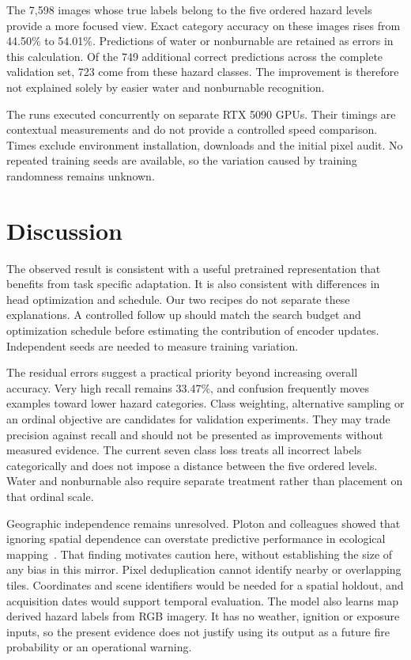 \documentclass[10pt,a4paper]{article}
\begin{document}
The 7,598 images whose true labels belong to the five ordered hazard levels
provide a more focused view. Exact category accuracy on these images rises
from 44.50\% to 54.01\%. Predictions of water or nonburnable are retained as
errors in this calculation. Of the 749 additional correct predictions
across the complete validation set, 723 come from these hazard classes.
The improvement is therefore not explained solely by easier water and
nonburnable recognition.

The runs executed concurrently on separate RTX 5090 GPUs. Their timings are
contextual measurements and do not provide a controlled speed comparison.
Times exclude environment installation, downloads and the initial pixel
audit. No repeated training seeds are available, so the variation caused by
training randomness remains unknown.

\section{Discussion}

The observed result is consistent with a useful pretrained representation
that benefits from task specific adaptation. It is also consistent with
differences in head optimization and schedule. Our two recipes do not
separate these explanations. A controlled follow up should match the search
budget and optimization schedule before estimating the contribution of
encoder updates. Independent seeds are needed to measure training variation.

The residual errors suggest a practical priority beyond increasing overall
accuracy. Very high recall remains 33.47\%, and confusion frequently moves
examples toward lower hazard categories. Class weighting, alternative
sampling or an ordinal objective are candidates for validation experiments.
They may trade precision against recall and should not be presented as
improvements without measured evidence. The current seven class loss treats
all incorrect labels categorically and does not impose a distance between
the five ordered levels. Water and nonburnable also require separate
treatment rather than placement on that ordinal scale.

Geographic independence remains unresolved. Ploton and colleagues showed
that ignoring spatial dependence can overstate predictive performance in
ecological mapping~\citep{ploton2020spatial}. That finding motivates caution
here, without establishing the size of any bias in this mirror. Pixel
deduplication cannot identify nearby or overlapping tiles. Coordinates and
scene identifiers would be needed for a spatial holdout, and acquisition
dates would support temporal evaluation. The model also learns map derived
hazard labels from RGB imagery. It has no weather, ignition or exposure
inputs, so the present evidence does not justify using its output as a
future fire probability or an operational warning.
\end{document}
